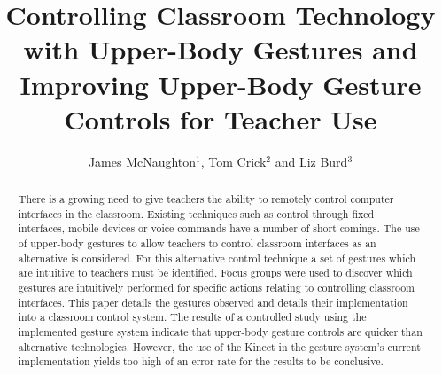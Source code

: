 \documentclass[link]{IWCOMP}
\begin{document}
\title{Controlling Classroom Technology with Upper-Body Gestures and Improving Upper-Body Gesture Controls for Teacher Use}

\author{James McNaughton$^{1}$, Tom Crick$^{2}$ and Liz Burd$^{3}$}



\begin{abstract}



There is a growing need to give teachers the ability to remotely control computer interfaces in the classroom.
Existing techniques such as control through fixed interfaces, mobile devices or voice commands have a number of short comings.
The use of upper-body gestures to allow teachers to control classroom interfaces as an alternative is considered.
For this alternative control technique a set of gestures which are intuitive to teachers must be identified.
Focus groups were used to discover which gestures are intuitively performed for specific actions relating to controlling classroom interfaces.
This paper details the gestures observed and details their implementation into a classroom control system.
The results of a controlled study using the implemented gesture system indicate that upper-body gesture controls are quicker than alternative technologies.
However, the use of the Kinect in the gesture system's current implementation yields too high of an error rate for the results to be conclusive.



\end{abstract}
\end{document}
